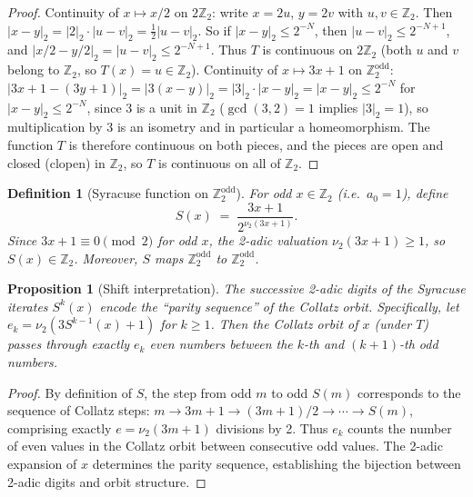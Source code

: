 \documentclass[12pt,a4paper]{article}
\newtheorem{proposition}[theorem]{Proposition}
\newtheorem{definition}[theorem]{Definition}
\begin{document}
\begin{proof}
Continuity of $x \mapsto x/2$ on $2\mathbb{Z}_2$: write $x = 2u$, $y = 2v$ with
$u, v \in \mathbb{Z}_2$. Then $|x - y|_2 = |2|_2 \cdot |u-v|_2 = \tfrac{1}{2}|u-v|_2$.
So if $|x - y|_2 \leq 2^{-N}$, then $|u-v|_2 \leq 2^{-N+1}$, and
$|x/2 - y/2|_2 = |u - v|_2 \leq 2^{-N+1}$.
Thus $T$ is continuous on $2\mathbb{Z}_2$ (both $u$ and $v$ belong to
$\mathbb{Z}_2$, so $T(x) = u \in \mathbb{Z}_2$).
Continuity of $x \mapsto 3x+1$ on $\mathbb{Z}_2^{\text{odd}}$:
$|3x+1 - (3y+1)|_2 = |3(x-y)|_2 = |3|_2 \cdot |x-y|_2 = |x-y|_2 \leq 2^{-N}$
for $|x-y|_2 \leq 2^{-N}$, since $3$ is a unit in $\mathbb{Z}_2$ ($\gcd(3,2)=1$
implies $|3|_2 = 1$), so multiplication by 3 is an isometry and in particular a
homeomorphism. The function $T$ is therefore continuous on both pieces, and the pieces
are open and closed (clopen) in $\mathbb{Z}_2$, so $T$ is continuous on all of $\mathbb{Z}_2$.
\end{proof}

\begin{definition}[Syracuse function on $\mathbb{Z}_2^{\text{odd}}$]\label{def:S_ext}
For odd $x \in \mathbb{Z}_2$ (i.e.\ $a_0 = 1$), define
\[
  S(x) \;=\; \frac{3x+1}{2^{\nu_2(3x+1)}}.
\]
Since $3x + 1 \equiv 0 \pmod{2}$ for odd $x$, the 2-adic valuation $\nu_2(3x+1) \geq 1$,
so $S(x) \in \mathbb{Z}_2$. Moreover, $S$ maps $\mathbb{Z}_2^{\text{odd}}$ to
$\mathbb{Z}_2^{\text{odd}}$.
\end{definition}

\begin{proposition}[Shift interpretation]\label{prop:shift}
The successive 2-adic digits of the Syracuse iterates $S^k(x)$ encode the ``parity
sequence'' of the Collatz orbit. Specifically, let $e_k = \nu_2(3 S^{k-1}(x) + 1)$ for
$k \geq 1$. Then the Collatz orbit of $x$ (under $T$) passes through exactly $e_k$ even
numbers between the $k$-th and $(k+1)$-th odd numbers.
\end{proposition}

\begin{proof}
By definition of $S$, the step from odd $m$ to odd $S(m)$ corresponds to the sequence
of Collatz steps: $m \to 3m+1 \to (3m+1)/2 \to \cdots \to S(m)$, comprising exactly
$e = \nu_2(3m+1)$ divisions by 2. Thus $e_k$ counts the number of even values in the
Collatz orbit between consecutive odd values. The 2-adic expansion of $x$ determines
the parity sequence, establishing the bijection between 2-adic digits and orbit structure.
\end{proof}
\end{document}
